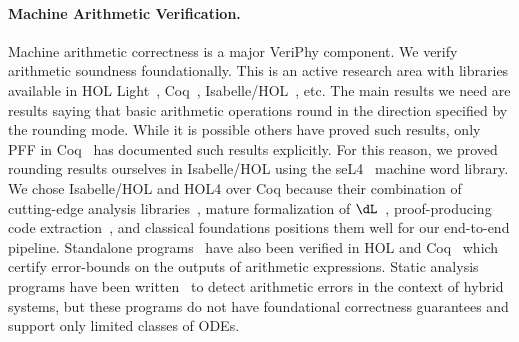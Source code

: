 \documentclass[12pt]{cmuthesis}
\theoremstyle{definition}
\theoremstyle{remark}
\newcommand{\Isabelle}{Isabelle/HOL\xspace}
\newcommand{\VeriPhy}{VeriPhy\xspace}
\begin{document}
\paragraph{Machine Arithmetic Verification.}
Machine arithmetic correctness is a major \VeriPhy component.
We verify arithmetic soundness foundationally.
This is an active research area with libraries available in HOL Light~\cite{DBLP:conf/sfm/Harrison06}, Coq~\cite{DBLP:conf/arith/BoldoM10,DBLP:conf/tphol/DaumasRT01,DBLP:conf/mkm/BoldoFM09,DBLP:journals/iandc/Melquiond12}, \Isabelle~\cite{DBLP:journals/afp/Yu13}, etc.
The main results we need are results saying that basic arithmetic operations round in the direction specified by the rounding mode.
While it is possible others have proved such results, only PFF in Coq~\cite{DBLP:conf/tphol/DaumasRT01} has documented such results explicitly.
For this reason, we proved rounding results ourselves in \Isabelle using the seL4~\cite{DBLP:journals/cacm/KleinAEHCDEEKNSTW10} machine word library.
We chose \Isabelle and HOL4 over Coq because their combination of cutting-edge analysis libraries~\cite{DBLP:conf/itp/ImmlerT16}, mature formalization of $\dL$~\cite{DBLP:conf/cpp/BohrerRVVP17}, proof-producing code extraction~\cite{DBLP:conf/icfp/MyreenO12}, and classical foundations positions them well for our end-to-end pipeline.
Standalone programs~\cite{DBLP:conf/tacas/2018-1} have also been verified in HOL and Coq~\cite{DBLP:conf/fmcad/BeckerZMDMF18} which certify error-bounds on the outputs of arithmetic expressions.
Static analysis programs have been written~\cite{DBLP:conf/emsoft/MartinezMST10,DBLP:conf/emsoft/MajumdarSZ12,DBLP:conf/cav/BouissouGPTV09} to detect arithmetic errors in the context of hybrid systems, but these programs do not have foundational correctness guarantees and support only limited classes of ODEs.
\end{document}
